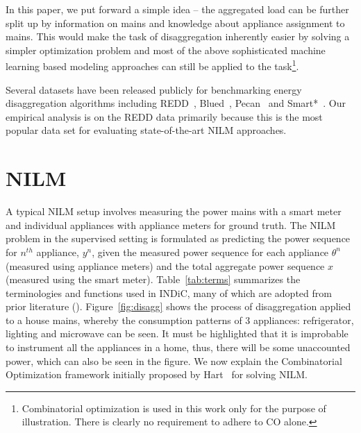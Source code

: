 \documentclass[conference]{IEEEtran}
\newcommand{\figref}[1]{Figure~\ref{#1}}
\newcommand{\tabref}[1]{Table~\ref{#1}}
\newcommand{\indicns}{INDiC}
\begin{document}
\noindent In this paper, we put forward a simple idea -- the aggregated load can be further split up by information on mains and knowledge about appliance assignment to mains. This would make the task of disaggregation inherently easier by solving a simpler optimization problem and most of the above sophisticated machine learning based modeling approaches can still be applied to the task\footnote{Combinatorial optimization is used in this work only for the purpose of illustration. There is clearly no requirement to adhere to CO alone.}. 

\noindent Several datasets have been released publicly for benchmarking energy disaggregation algorithms including REDD~\cite{redd}, Blued~\cite{blued_cmu}, Pecan~\cite{pecan} and Smart*~\cite{smart}. Our empirical analysis is on the REDD data primarily because this is the most popular data set for evaluating state-of-the-art NILM approaches. 

\vspace{-2mm}
\section{NILM}
\vspace{-1mm}
\noindent A typical NILM setup involves measuring the power mains with a smart meter and individual appliances with appliance meters for ground truth. The NILM problem in the supervised setting is formulated as predicting the power sequence for $n^{th}$ appliance, $y^n$, given the measured power sequence for each appliance $\theta^n$ (measured using appliance meters) and the total aggregate power sequence $x$ (measured using the smart meter). \tabref{tab:terms} summarizes the terminologies and functions used in \indicns, many of which are adopted from prior literature (\cite{redd,parson2012_aaai,hart}). \figref{fig:disagg} shows the process of disaggregation applied to a house mains, whereby the consumption patterns of 3 appliances: refrigerator, lighting and microwave can be seen. It must be highlighted that it is improbable to instrument all the appliances in a home, thus, there will be some unaccounted power, which can also be seen in the figure. We now explain the Combinatorial Optimization framework initially proposed by Hart~\cite{hart} for solving NILM.
\end{document}
